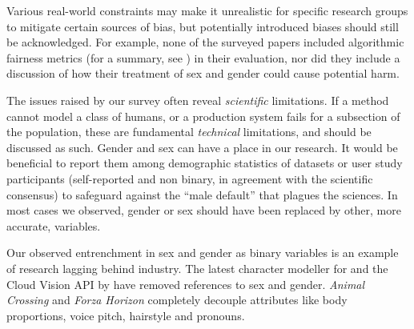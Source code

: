 \documentclass[nonacm,sigconf,review,balance=false]{acmart}
\begin{document}
Various real-world constraints may make it unrealistic for specific research groups to mitigate certain sources of bias, but potentially introduced biases should still be acknowledged. For example, none of the surveyed papers included algorithmic fairness metrics (for a summary, see \cite{fairnesssurvey, fairnessmetrics}) in their evaluation, nor did they include a discussion of how their treatment of sex and gender could cause potential harm.

The issues raised by our survey often reveal \emph{scientific} limitations. If a method cannot model a class of humans, or a production system fails for a subsection of the population, these are fundamental \emph{technical} limitations, and should be discussed as such. Gender and sex can have a place in our research. It would be beneficial to report them among demographic statistics of datasets or user study participants (self-reported and non binary, in agreement with the scientific consensus) to
safeguard against the “male default” that plagues the sciences. In most cases we observed, gender or sex should have been replaced by other, more accurate, variables.

Our observed entrenchment in sex and gender as binary variables is an example of research lagging behind industry. The latest character modeller for \citet{metahuman} and the Cloud Vision API by \citet{googlegender} have removed references to sex and gender. \emph{Animal Crossing} and \emph{Forza Horizon} completely decouple attributes like body proportions, voice pitch, hairstyle and pronouns.
\end{document}
